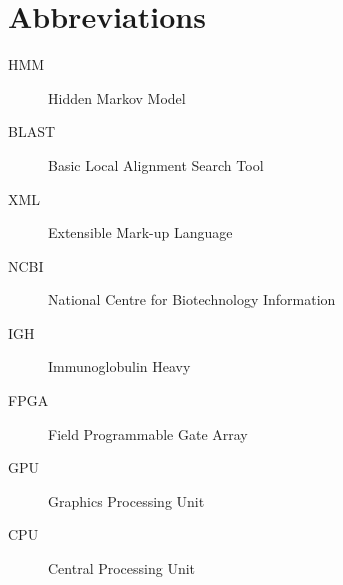 \chapter*{Abbreviations}\label{abbr}
\begin{description}
	\item[HMM] Hidden Markov Model
	\item[BLAST] Basic Local Alignment Search Tool
	\item[XML] Extensible Mark-up Language
	\item[NCBI] National Centre for Biotechnology Information
    \item[IGH] Immunoglobulin Heavy
    \item[FPGA] Field Programmable Gate Array
    \item[GPU] Graphics Processing Unit
    \item[CPU] Central Processing Unit
\end{description}
